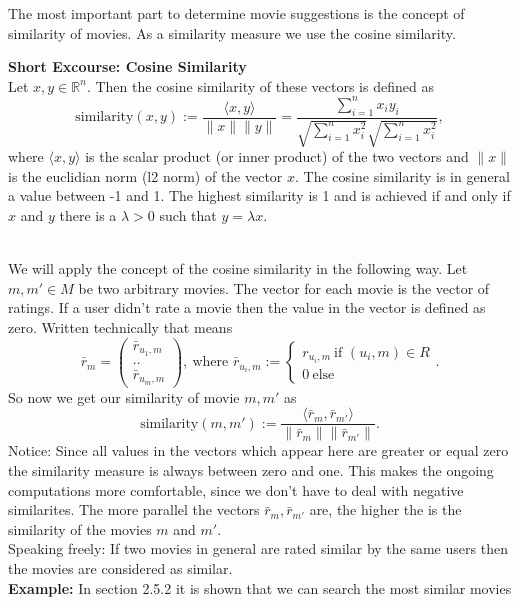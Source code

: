 \documentclass{article}
\begin{document}
The most important part to determine movie suggestions is the concept of similarity of movies. As a similarity measure we use the cosine similarity.\\[2ex]
\begin{boxedminipage}{\textwidth}
\textbf{Short Excourse: Cosine Similarity}\\[2ex]
Let $x, y \in \mathbb{R}^n$. Then the cosine similarity of these vectors is defined as
\[ \text{similarity}(x,y) := \frac{\langle x,y\rangle}{\lVert x\rVert \lVert y \rVert} = \frac{\sum_{i=1}^n x_i y_i}{\sqrt{\sum_{i=1}^nx_i^2}\sqrt{\sum_{i=1}^nx_i^2}},\]
where $\langle x,y\rangle$ is the scalar product (or inner product) of the two vectors and $\lVert x \rVert$ is the euclidian norm (l2 norm) of the vector $x$.
The cosine similarity is in general a value between -1 and  1. The highest similarity is 1 and is achieved if and only if $x$ and $y$ there is a $\lambda > 0$ such that $y = \lambda x$.
\end{boxedminipage}\\[2ex]
We will apply the concept of the cosine similarity in the following way. Let $m, m' \in M$ be two arbitrary movies. The vector for each movie is the vector of ratings. If a user didn't rate a movie then the value in the vector is defined as zero. Written technically that means
\[ \bar{r}_m = \begin{pmatrix} \bar{r}_{u_1,m} \\ .. \\ \bar{r}_{u_m, m}\end{pmatrix},~\text{where }\bar{r}_{u_i, m} := \begin{cases} r_{u_i,m}~\text{if }(u_i,m)\in R \\ 0~\text{else}\end{cases}.\]
So now we get our similarity of movie $m, m'$ as
\[ \text{similarity}(m,m'):= \frac{\langle \bar{r}_{m}, \bar{r}_{m'}\rangle}{\lVert \bar{r}_m \rVert \lVert \bar{r}_{m'} \rVert }.\]
Notice: Since all values in the vectors which appear here are greater or equal zero the similarity measure is always between zero and one. This makes the ongoing computations more comfortable, since we don't have to deal with negative similarites.
The more parallel the vectors $\bar{r}_m, \bar{r}_{m'}$ are, the higher the  is the similarity of the movies $m$ and $m'$.\\
Speaking freely: If two movies in general are rated similar by the same users then the movies are considered as similar.\\
\textbf{Example:} In section 2.5.2 it is shown that we can search the most similar movies 
\end{document}
